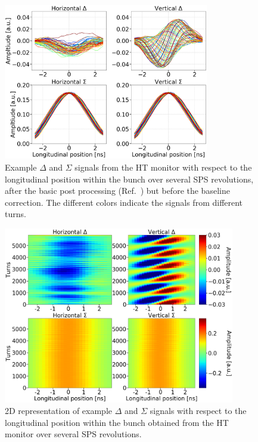 

\begin{figure}[!h]
   \centering         
   \includegraphics[width=0.8\textwidth]{images/Ch4/HT_1D__20180530_135105exampleAcq_4thesis_turnsStart0_Stop6000_step100_new.png}
       \caption{Example $\Delta$ and $\Sigma$ signals from the HT monitor with respect to the longitudinal position within the bunch over several SPS revolutions, after the basic post processing (Ref.~\cite{Levens:2313358}) but before the baseline correction. The different colors indicate the signals from different turns.}
       \label{fig:HT_example_signals}
\end{figure}

\begin{figure}[!h]
   \centering         
   \includegraphics[width=0.9\textwidth]{images/Ch4/HT_2D__20180530_135105_colorbar_new_version.png}
       \caption{2D representation of example $\Delta$ and $\Sigma$ signals with respect to the longitudinal position within the bunch obtained from the HT monitor over several SPS revolutions.}
       \label{fig:HT_example_signals_2D}
\end{figure}


